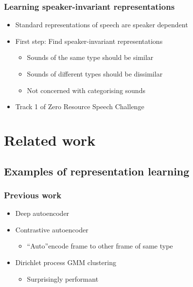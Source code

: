 \documentclass[british]{beamer}
\begin{document}
  \begin{frame}
    \frametitle{Learning speaker-invariant representations}
    
    \begin{itemize}
     \item Standard representations of speech are speaker dependent
     \item First step: Find speaker-invariant representations
     \begin{itemize}
      \item Sounds of the same type should be similar
      \item Sounds of different types should be dissimilar
      \item Not concerned with categorising sounds
     \end{itemize}
     \item Track 1 of Zero Resource Speech Challenge
    \end{itemize}
    
  \end{frame}

  \section{Related work}
  \subsection{Examples of representation learning}
  
  \begin{frame}
    \frametitle{Previous work}
    
    \begin{itemize}
    \item Deep autoencoder
    \item Contrastive autoencoder
      \begin{itemize}
      \item ``Auto''encode frame to other frame of same type
      \end{itemize}
    \item Dirichlet process GMM clustering
      \begin{itemize}
      \item Surprisingly performant
     \end{itemize}
   \end{itemize}
    
 \end{frame}
  
\end{document}
